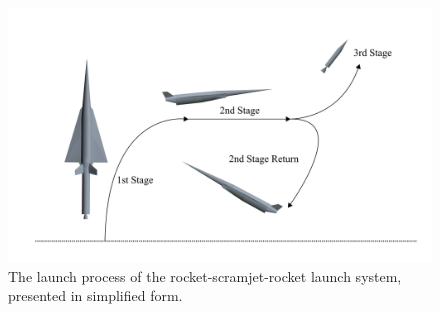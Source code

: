 	
	  






\begin{figure}[ht]
	\centering
	\includegraphics[width=0.9\linewidth]{figures/3_vehicle_design/Trajsimple}
	\caption{The launch process of the rocket-scramjet-rocket launch system, presented in simplified form.}
	\label{fig:Trajsimple}
\end{figure}



